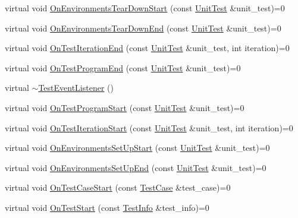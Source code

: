 \begin{DoxyCompactItemize}
\item 
virtual void \hyperlink{classtesting_1_1_test_event_listener_a468b5e6701bcb86cb2c956caadbba5e4}{On\-Environments\-Tear\-Down\-Start} (const \hyperlink{classtesting_1_1_unit_test}{Unit\-Test} \&unit\-\_\-test)=0
\item 
virtual void \hyperlink{classtesting_1_1_test_event_listener_a9ea04fa7f447865ba76df35e12ba2092}{On\-Environments\-Tear\-Down\-End} (const \hyperlink{classtesting_1_1_unit_test}{Unit\-Test} \&unit\-\_\-test)=0
\item 
virtual void \hyperlink{classtesting_1_1_test_event_listener_a550fdb3e55726e4cefa09f5697941425}{On\-Test\-Iteration\-End} (const \hyperlink{classtesting_1_1_unit_test}{Unit\-Test} \&unit\-\_\-test, int iteration)=0
\item 
virtual void \hyperlink{classtesting_1_1_test_event_listener_ad15b6246d94c268e233487a86463ef3d}{On\-Test\-Program\-End} (const \hyperlink{classtesting_1_1_unit_test}{Unit\-Test} \&unit\-\_\-test)=0
\item 
virtual \hyperlink{classtesting_1_1_test_event_listener_a4512d19e7a108ec4926239ec1ea85d63}{$\sim$\-Test\-Event\-Listener} ()
\item 
virtual void \hyperlink{classtesting_1_1_test_event_listener_a5f6c84f39851e8a603a2d2e10063816b}{On\-Test\-Program\-Start} (const \hyperlink{classtesting_1_1_unit_test}{Unit\-Test} \&unit\-\_\-test)=0
\item 
virtual void \hyperlink{classtesting_1_1_test_event_listener_a60cc09b7907cb329d152eb5e7133bdeb}{On\-Test\-Iteration\-Start} (const \hyperlink{classtesting_1_1_unit_test}{Unit\-Test} \&unit\-\_\-test, int iteration)=0
\item 
virtual void \hyperlink{classtesting_1_1_test_event_listener_aa6502e534919605be45f26a6daf9a40c}{On\-Environments\-Set\-Up\-Start} (const \hyperlink{classtesting_1_1_unit_test}{Unit\-Test} \&unit\-\_\-test)=0
\item 
virtual void \hyperlink{classtesting_1_1_test_event_listener_aaa1021d75f5dbf3f05c829c1cc520341}{On\-Environments\-Set\-Up\-End} (const \hyperlink{classtesting_1_1_unit_test}{Unit\-Test} \&unit\-\_\-test)=0
\item 
virtual void \hyperlink{classtesting_1_1_test_event_listener_ab4ed885d63f5bbff8076c1329b3dfe36}{On\-Test\-Case\-Start} (const \hyperlink{classtesting_1_1_test_case}{Test\-Case} \&test\-\_\-case)=0
\item 
virtual void \hyperlink{classtesting_1_1_test_event_listener_ab4f6a0ca16ae75daf385b3b5914e1048}{On\-Test\-Start} (const \hyperlink{classtesting_1_1_test_info}{Test\-Info} \&test\-\_\-info)=0

\end{DoxyCompactItemize}
